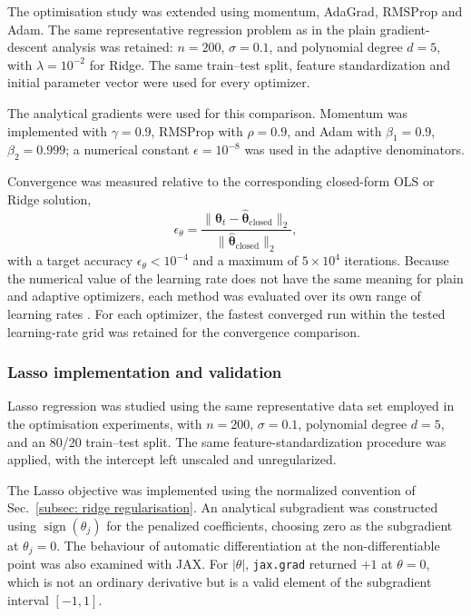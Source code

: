 \documentclass[aps,rmp,reprint,amsmath,amssymb,graphicx,longbibliography]{revtex4-1}
\begin{document}
The optimisation study was extended using momentum, AdaGrad, RMSProp and Adam.
The same representative regression problem as in the plain gradient-descent
analysis was retained: $n=200$, $\sigma=0.1$, and polynomial degree $d=5$,
with $\lambda=10^{-2}$ for Ridge. The same train--test split, feature
standardization and initial parameter vector were used for every optimizer.

The analytical gradients were used for this comparison. Momentum was implemented with $\gamma=0.9$, RMSProp with $\rho=0.9$, and Adam with $\beta_1=0.9$, $\beta_2=0.999$; a numerical constant $\epsilon=10^{-8}$ was used in the adaptive denominators.

Convergence was measured relative to the corresponding closed-form OLS or
Ridge solution,
\begin{equation}
    \epsilon_\theta
    =
    \frac{
        \|\boldsymbol{\theta}_t-
        \hat{\boldsymbol{\theta}}_{\mathrm{closed}}\|_2
    }{
        \|\hat{\boldsymbol{\theta}}_{\mathrm{closed}}\|_2
    },
    \label{eq:epsilon0}
\end{equation}
with a target accuracy $\epsilon_\theta<10^{-4}$ and a maximum of $5\times
10^4$ iterations. Because the numerical value of the learning rate does not
have the same meaning for plain and adaptive optimizers, each method was
evaluated over its own range of learning rates \cite{HjorthJensen2026MLPSCh4}. For each optimizer, the fastest converged run within the tested learning-rate grid was retained for the convergence comparison.

\subsubsection*{Lasso implementation and validation}

Lasso regression was studied using the same representative data set employed
in the optimisation experiments, with $n=200$, $\sigma=0.1$, polynomial
degree $d=5$, and an 80/20 train--test split. The same feature-standardization
procedure was applied, with the intercept left unscaled and unregularized.

The Lasso objective was implemented using the normalized convention of
Sec.~\ref{subsec: ridge regularisation}. An analytical subgradient was constructed using $\operatorname{sign}(\theta_j)$ for the penalized coefficients, choosing zero
as the subgradient at $\theta_j=0$. The behaviour of automatic differentiation at the non-differentiable point was also examined with JAX. For $|\theta|$, \texttt{jax.grad} returned $+1$ at $\theta=0$, which is not an ordinary derivative but is a valid element of the subgradient interval $[-1,1]$.
\end{document}
